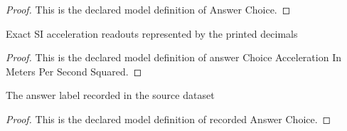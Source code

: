 \begin{proof}
  This is the declared model definition of Answer Choice.
\end{proof}
\begin{definition}
  \label{def:physics:phyx-mini-0754:phyxminiproblems-problemphyxmini0754-answerchoiceaccelerationinmeterspersecondsquared}
  Exact SI acceleration readouts represented by the printed decimals
\end{definition}
\begin{proof}
  This is the declared model definition of answer Choice Acceleration In Meters Per Second Squared.
\end{proof}
\begin{definition}
  \label{def:physics:phyx-mini-0754:phyxminiproblems-problemphyxmini0754-recordedanswerchoice}
  The answer label recorded in the source dataset
\end{definition}
\begin{proof}
  This is the declared model definition of recorded Answer Choice.
\end{proof}
